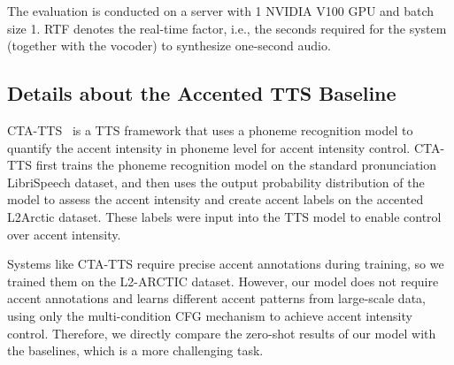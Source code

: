 The evaluation is conducted on a server with 1 NVIDIA V100 GPU and batch size 1. RTF denotes the real-time factor, i.e., the seconds required for the system (together with the vocoder) to synthesize one-second audio.


\subsection{Details about the Accented TTS Baseline}
\label{app:detail_accented_tts_experiment}
CTA-TTS~\citep{liu2024controllable} is a TTS framework that uses a phoneme recognition model to quantify the accent intensity in phoneme level for accent intensity control. CTA-TTS first trains the phoneme recognition model on the standard pronunciation LibriSpeech dataset, and then uses the output probability distribution of the model to assess the accent intensity and create accent labels on the accented L2Arctic dataset. These labels were input into the TTS model to enable control over accent intensity.

Systems like CTA-TTS require precise accent annotations during training, so we trained them on the L2-ARCTIC dataset. However, our model does not require accent annotations and learns different accent patterns from large-scale data, using only the multi-condition CFG mechanism to achieve accent intensity control. Therefore, we directly compare the zero-shot results of our model with the baselines, which is a more challenging task.

